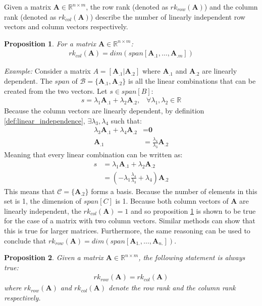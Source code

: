 \documentclass[a4paper,12pt]{book}
\newcommand{\set}[1]{\mathcal{#1}}
\newcommand{\matrx}[1]{\bm{#1}}
\newcommand{\vectr}[1]{\textbf{#1}}
\newcommand{\real}{\mathbb{R}}
\newcommand{\italic}[1]{\textit{#1}}
\newcommand{\rrank}[1]{rk_{row}(\matrx{#1})}
\newcommand{\crank}[1]{rk_{col}(\matrx{#1})}
\newtheorem{proposition}{Proposition}[section]
\begin{document}
	Given a matrix $ \matrx{A} \in \real^{n \times m} $, the row rank (denoted as $ \rrank{A} $) and the column rank (denoted as $ \crank{A} $) describe the number of linearly independent row vectors and column vectors respectively.
	\begin{proposition}
		\normalfont For a matrix $ \matrx{A} \in \real^{n \times m} $:
		\begin{align}
			\crank{A} = dim(span[\matrx{A}_{.1}, \ldots, \matrx{A}_{.m}])
		\end{align}
		\label{prop:c_rank_dim}
	\end{proposition}
	\noindent\italic{Example:}
	Consider a matrix $A = [\matrx{A}_{.1} | \matrx{A}_{.2}]$ where $ \matrx{A}_{.1} $ and $ \matrx{A}_{.2} $ are linearly dependent. The $ span $ of $\set{B} = \{\matrx{A}_{.1}, \matrx{A}_{.2}\} $ is all the linear combinations that can be created from the two vectors. Let $ s \in span[B] $:  
	\begin{align}
		s = \lambda_1 \matrx{A}_{.1} + \lambda_2 \matrx{A}_{.2}, \hspace{10pt}\forall \lambda_1, \lambda_2 \in \real
	\end{align}
	Because the column vectors are linearly dependent, by definition \ref{def:linear_independence}, 	$ \exists \lambda_3, \lambda_4$ such that: 
	\begin{align}
		\lambda_3 \matrx{A}_{.1} + \lambda_4 \matrx{A}_{.2} &= \vectr{0} \\
		\matrx{A}_{.1} &= \frac{\lambda_4}{\lambda_3} \matrx{A}_{.2}
	\end{align}
	Meaning that every linear combination can be written as:
	\begin{align}
		s &= \lambda_1 \matrx{A}_{.1} + \lambda_2 \matrx{A}_{.2} \\
		&= (-\lambda_1 \frac{\lambda_4}{\lambda_3} + \lambda_4) \matrx{A}_{.2}
	\end{align}
	This means that $ \set{C} = \{\matrx{A}_{.2}\} $ forms a basis. Because the number of elements in this set is 1, the dimension of $ span[C] $ is 1. Because both column vectors of $ \matrx{A} $ are linearly independent, the $ \crank{A} = 1$ and so proposition \ref{prop:c_rank_dim} is shown to be true for the case of a matrix with two column vectors. Similar methods can show that this is true for larger matrices. Furthermore, the same reasoning can be used to conclude that $ \rrank{\matrx{A}} = dim(span[\matrx{A}_{1.}, \ldots, \matrx{A}_{n.}]) $.
	\begin{proposition}
		\normalfont Given a matrix $ \matrx{A} \in \real^{n \times m}$, the following statement is always true:
		\begin{align}
			\rrank{A} = \crank{A}
			\label{eq:row_rank_col_rank}
		\end{align}
		where $ \rrank{A} $ and $ \crank{A} $ denote the row rank and the column rank respectively.
		\label{prop:row_rank_col_rank}
	\end{proposition}
\end{document}
